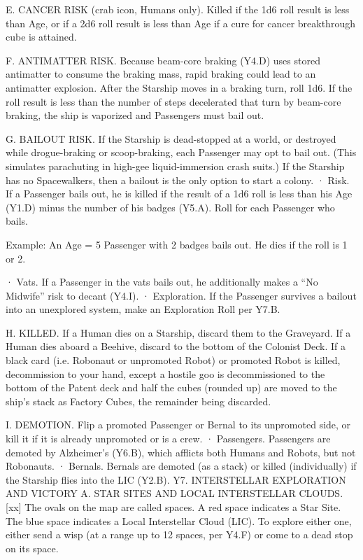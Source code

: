 \documentclass[a4paper]{book}
\begin{document}
E. CANCER RISK (crab icon, Humans only). Killed if the 1d6 roll result is less than Age, or if a 2d6 roll result is less than Age if a cure for cancer breakthrough cube is attained.
 
F. ANTIMATTER RISK. Because beam-core braking (Y4.D) uses stored antimatter to consume the braking mass, rapid braking could lead to an antimatter explosion. After the Starship moves in a braking turn, roll 1d6. If the roll result is less than the number of steps decelerated that turn by beam-core braking, the ship is vaporized and Passengers must bail out.
 
G. BAILOUT RISK. If the Starship is dead-stopped at a world, or destroyed while drogue-braking or scoop-braking, each Passenger may opt to bail out. (This simulates parachuting in high-gee liquid-immersion crash suits.) If the Starship has no Spacewalkers, then a bailout is the only option to start a colony.
·       Risk. If a Passenger bails out, he is killed if the result of a 1d6 roll is less than his Age (Y1.D) minus the number of his badges (Y5.A). Roll for each Passenger who bails.
 
Example: An Age = 5 Passenger with 2 badges bails out. He dies if the roll is 1 or 2.
 
·       Vats. If a Passenger in the vats bails out, he additionally makes a “No Midwife” risk to decant (Y4.I).
·       Exploration. If the Passenger survives a bailout into an unexplored system, make an Exploration Roll per Y7.B.
 
H. KILLED. If a Human dies on a Starship, discard them to the Graveyard. If a Human dies aboard a Beehive, discard to the bottom of the Colonist Deck. If a black card (i.e. Robonaut or unpromoted Robot) or promoted Robot is killed, decommission to your hand, except a hostile goo is decommissioned to the bottom of the Patent deck and half the cubes (rounded up) are moved to the ship’s stack as Factory Cubes, the remainder being discarded.
 
I. DEMOTION. Flip a promoted Passenger or Bernal to its unpromoted side, or kill it if it is already unpromoted or is a crew.
·       Passengers. Passengers are demoted by Alzheimer’s (Y6.B), which afflicts both Humans and Robots, but not Robonauts.
·       Bernals. Bernals are demoted (as a stack) or killed (individually) if the Starship flies into the LIC (Y2.B).
Y7. INTERSTELLAR EXPLORATION AND VICTORY
A. STAR SITES AND LOCAL INTERSTELLAR CLOUDS.[xx] The ovals on the map are called spaces. A red space indicates a Star Site. The blue space indicates a Local Interstellar Cloud (LIC). To explore either one, either send a wisp (at a range up to 12 spaces, per Y4.F) or come to a dead stop on its space.
\end{document}
